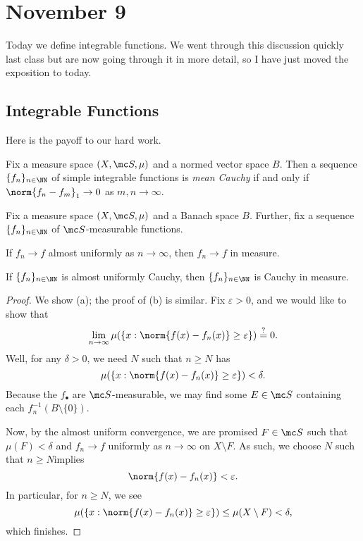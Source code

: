 \documentclass[../notes.tex]{subfiles}
\begin{document}
\section{November 9}

Today we define integrable functions. We went through this discussion quickly last class but are now going through it in more detail, so I have just moved the exposition to today.

\subsection{Integrable Functions}
Here is the payoff to our hard work.
\begin{definition}
	Fix a measure space $(X,\mc S,\mu)$ and a normed vector space $B$. Then a sequence $\{f_n\}_{n\in\NN}$ of simple integrable functions is \textit{mean Cauchy} if and only if $\norm{f_n-f_m}_1\to0$ as $m,n\to\infty$.
\end{definition}
\begin{lemma}
	Fix a measure space $(X,\mc S,\mu)$ and a Banach space $B$. Further, fix a sequence $\{f_n\}_{n\in\NN}$ of $\mc S$-measurable functions.
	\begin{listalph}
		\item If $f_n\to f$ almost uniformly as $n\to\infty$, then $f_n\to f$ in measure.
		\item If $\{f_n\}_{n\in\NN}$ is almost uniformly Cauchy, then $\{f_n\}_{n\in\NN}$ is Cauchy in measure.
	\end{listalph}
\end{lemma}
\begin{proof}
	We show (a); the proof of (b) is similar. Fix $\varepsilon>0$, and we would like to show that
	\[\lim_{n\to\infty}\mu(\{x:\norm{f(x)-f_n(x)}\ge\varepsilon\})\stackrel?=0.\]
	Well, for any $\delta>0$, we need $N$ such that $n\ge N$ has
	\[\mu(\{x:\norm{f(x)-f_n(x)}\ge\varepsilon\})<\delta.\]
	Because the $f_\bullet$ are $\mc S$-measurable, we may find some $E\in\mc S$ containing each $f_n^{-1}(B\setminus\{0\})$.

	Now, by the almost uniform convergence, we are promised $F\in\mc S$ such that $\mu(F)<\delta$ and $f_n\to f$ uniformly as $n\to\infty$ on $X\setminus F$. As such, we choose $N$ such that $n\ge N$implies
	\[\norm{f(x)-f_n(x)}<\varepsilon.\]
	In particular, for $n\ge N$, we see
	\[\mu(\{x:\norm{f(x)-f_n(x)}\ge\varepsilon\})\le\mu(X\setminus F)<\delta,\]
	which finishes.
\end{proof}
\end{document}

